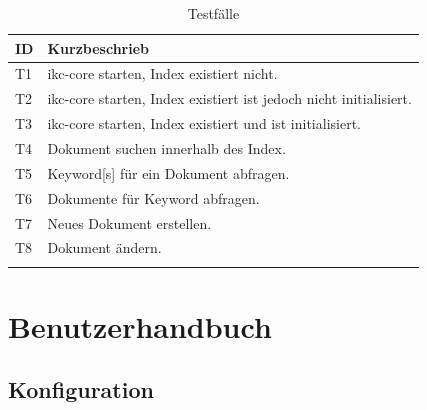 \begin{longtable}{|p{1cm} | P{6cm} |}
  \hline
    ID & Kurzbeschrieb \\\hline
    T1 & \gls{ikc-core} starten, Index existiert nicht.\\\hline
    T2 & \gls{ikc-core} starten, Index existiert ist jedoch nicht initialisiert.\\\hline
    T3 & \gls{ikc-core} starten, Index existiert und ist initialisiert.\\\hline
    T4 & Dokument suchen innerhalb des Index.\\\hline
    T5 & \gls{Keyword}[s] für ein Dokument abfragen.\\\hline
    T6 & Dokumente für \gls{Keyword} abfragen.\\\hline
    T7 & Neues Dokument erstellen.\\\hline
    T8 & Dokument ändern.\\\hline
    \caption{Testfälle}
  \label{tab:testkonzept}
\end{longtable}

\section{Benutzerhandbuch}\label{tutorial}

\subsection{Konfiguration}

